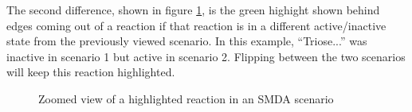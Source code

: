 The second difference, shown in figure \ref{fig:smda_results_highlight}, is the
green highight shown behind edges coming out of a reaction if that reaction is
in a different active/inactive state from the previously viewed scenario. In
this example, ``Triose...'' was inactive in scenario 1 but active in scenario 2.
Flipping between the two scenarios will keep this reaction highlighted.

\begin{figure}[htb]
    \caption{\label{fig:smda_results_highlight} Zoomed view of a highlighted
    reaction in an SMDA scenario}
\end{figure}

